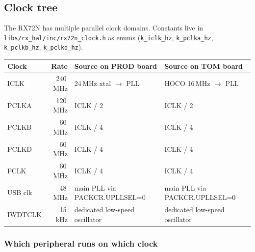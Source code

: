 \subsection{Clock tree}

The RX72N has multiple parallel clock domains. Constants live in
\texttt{libs/rx\_hal/inc/rx72n\_clock.h} as enums (\texttt{k\_iclk\_hz},
\texttt{k\_pclka\_hz}, \texttt{k\_pclkb\_hz}, \texttt{k\_pclkd\_hz}).

\begin{center}
\begin{tabular}{|l|r|p{4.5cm}|p{4.5cm}|}
\hline
\textbf{Clock} & \textbf{Rate}      & \textbf{Source on PROD board}     & \textbf{Source on TOM board}      \\
\hline
ICLK    & 240\,MHz                  & 24\,MHz xtal $\rightarrow$ PLL    & HOCO 16\,MHz $\rightarrow$ PLL    \\
PCLKA   & 120\,MHz                  & ICLK / 2                          & ICLK / 2                          \\
PCLKB   & 60\,MHz                   & ICLK / 4                          & ICLK / 4                          \\
PCLKD   & 60\,MHz                   & ICLK / 4                          & ICLK / 4                          \\
FCLK    & 60\,MHz                   & ICLK / 4                          & ICLK / 4                          \\
USB clk & 48\,MHz                   & main PLL via PACKCR.UPLLSEL=0     & main PLL via PACKCR.UPLLSEL=0     \\
IWDTCLK & 15\,kHz                   & dedicated low-speed oscillator    & dedicated low-speed oscillator    \\
\hline
\end{tabular}
\end{center}

\subsubsection{Which peripheral runs on which clock}

